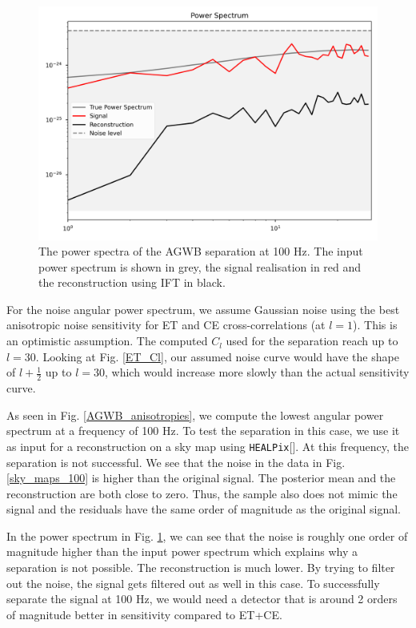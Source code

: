 \begin{figure}
    \centering
    \includegraphics[width=0.8\linewidth]{Images/power_spectrum_100Hz_2D.png}
    \caption[The power spectra of the AGWB separation at 100 Hz.]{The power spectra of the AGWB separation at 100 Hz. The input power spectrum is shown in grey, the signal realisation in red and the reconstruction using IFT in black.}
    \label{100Hz_power_spectrum}
\end{figure} 

For the noise angular power spectrum, we assume Gaussian noise using the best anisotropic noise sensitivity for ET and CE cross-correlations (at $l=1$). This is an optimistic assumption. The computed $C_l$ used for the separation reach up to $l=30$. Looking at Fig. \ref{ET_Cl}, our assumed noise curve would have the shape of $l+\frac{1}{2}$ up to $l=30$, which would increase more slowly than the actual sensitivity curve. 

As seen in Fig. \ref{AGWB_anisotropies}, we compute the lowest angular power spectrum at a frequency of 100 Hz. To test the separation in this case, we use it as input for a reconstruction on a sky map using {\tt HEALPix}[\cite{gorski_healpix_2005}]. At this frequency, the separation is not successful. We see that the noise in the data in Fig. \ref{sky_maps_100} is higher than the original signal. The posterior mean and the reconstruction are both close to zero. Thus, the sample also does not mimic the signal and the residuals have the same order of magnitude as the original signal.

In the power spectrum in Fig. \ref{100Hz_power_spectrum}, we can see that the noise is roughly one order of magnitude higher than the input power spectrum which explains why a separation is not possible. The reconstruction is much lower. By trying to filter out the noise, the signal gets filtered out as well in this case. To successfully separate the signal at 100 Hz, we would need a detector that is around 2 orders of magnitude better in sensitivity compared to ET+CE.

